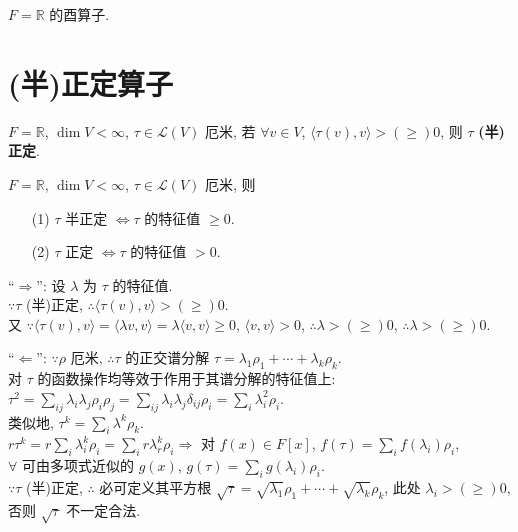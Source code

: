 \documentclass{note}
\begin{document}
\begin{df}[正交算子]
    $F=\mathbb{R}$ 的酉算子.
\end{df}

\section{(半)正定算子}
\begin{df}[(半)正定算子]
    $F=\mathbb{R}$, $\dim V<\infty$, $\tau\in\mathcal{L}(V)$ 厄米, 若 $\forall v\in V$, $\langle\tau(v),v\rangle>(\geq)0$, 则 $\tau$ \textbf{(半)正定}.
\end{df}

\begin{thm}
    $F=\mathbb{R}$, $\dim V<\infty$, $\tau\in\mathcal{L}(V)$ 厄米, 则
    \begin{itemize}
        \item[(1)] $\tau$ 半正定 $\Longleftrightarrow\tau$ 的特征值 $\geq 0$.
        \item[(2)] $\tau$ 正定 $\Longleftrightarrow\tau$ 的特征值 $>0$.
    \end{itemize}
\end{thm}
\begin{pf}
        ``$\Longrightarrow$'': 设 $\lambda$ 为 $\tau$ 的特征值.\\
        $\because\tau$ (半)正定, $\therefore\langle\tau(v),v\rangle>(\geq)0$.\\
        又 $\because\langle\tau(v),v\rangle=\langle\lambda v,v\rangle=\lambda\langle v,v\rangle\geq 0$, $\langle v,v\rangle>0$, $\therefore\lambda>(\geq)0$, $\therefore\lambda>(\geq)0$.

        ``$\Longleftarrow$'': $\because\rho$ 厄米, $\therefore\tau$ 的正交谱分解 $\tau=\lambda_1\rho_1+\cdots+\lambda_k\rho_k$.\\
        对 $\tau$ 的函数操作均等效于作用于其谱分解的特征值上: $\tau^2=\sum_{ij}\lambda_i\lambda_j\rho_i\rho_j=\sum_{ij}\lambda_i\lambda_j\delta_{ij}\rho_i=\sum_i\lambda_i^2\rho_i$.\\
        类似地, $\tau^k=\sum_{i}\lambda^k\rho_k$.\\
        $r\tau^k=r\sum_i\lambda_i^k\rho_i=\sum_ir\lambda_r^k\rho_i\Longrightarrow$ 对 $f(x)\in F[x]$, $f(\tau)=\sum_if(\lambda_i)\rho_i$,\\
        $\forall$ 可由多项式近似的 $g(x)$, $g(\tau)=\sum_ig(\lambda_i)\rho_i$.\\
        $\because\tau$ (半)正定, $\therefore$ 必可定义其平方根 $\sqrt{\tau}=\sqrt{\lambda_1}\rho_1+\cdots+\sqrt{\lambda_k}\rho_k$, 此处 $\lambda_i>(\geq)0$, 否则 $\sqrt{\tau}$ 不一定合法.
\end{pf}
\end{document}
